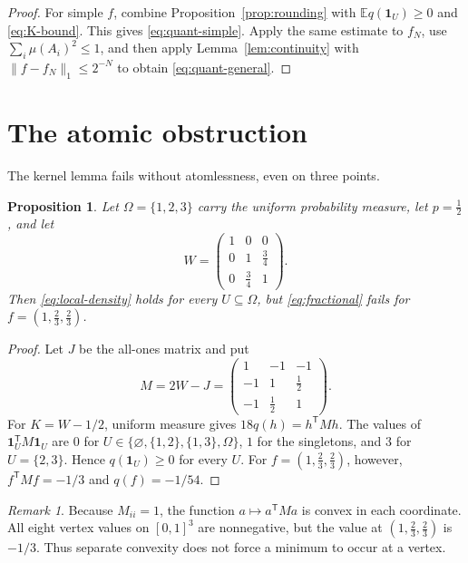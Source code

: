\documentclass[reqno]{amsart}
\theoremstyle{plain}
\newtheorem{proposition}[theorem]{Proposition}
\theoremstyle{remark}
\newtheorem{remark}[theorem]{Remark}
\newcommand{\one}{\mathbf 1}
\newcommand{\E}{\mathbb E}
\newcommand{\normone}[1]{\lVert #1\rVert_1}
\begin{document}
\begin{proof}
For simple $f$, combine Proposition~\ref{prop:rounding} with
$\E q(\one_U)\geq0$ and \eqref{eq:K-bound}. This gives
\eqref{eq:quant-simple}. Apply the same estimate to $f_N$, use
$\sum_i\mu(A_i)^2\leq1$, and then apply Lemma~\ref{lem:continuity} with
$\normone{f-f_N}\leq2^{-N}$ to obtain \eqref{eq:quant-general}.
\end{proof}

\section{The atomic obstruction}\label{sec:atoms}

The kernel lemma fails without atomlessness, even on three points.

\begin{proposition}\label{prop:atomic-example}
Let $\Omega=\{1,2,3\}$ carry the uniform probability measure, let
$p=\tfrac12$, and let
\[
  W=
  \begin{pmatrix}
    1&0&0\\
    0&1&\tfrac34\\
    0&\tfrac34&1
  \end{pmatrix}.
\]
Then \eqref{eq:local-density} holds for every $U\subseteq\Omega$, but
\eqref{eq:fractional} fails for $f=(1,\tfrac23,\tfrac23)$.
\end{proposition}

\begin{proof}
Let $J$ be the all-ones matrix and put
\[
  M=2W-J=
  \begin{pmatrix}
    1&-1&-1\\
    -1&1&\tfrac12\\
    -1&\tfrac12&1
  \end{pmatrix}.
\]
For $K=W-1/2$, uniform measure gives
$18q(h)=h^{\mathsf T}Mh$. The values of
$\one_U^{\mathsf T}M\one_U$ are $0$ for
$U\in\{\varnothing,\{1,2\},\{1,3\},\Omega\}$, $1$ for the singletons, and
$3$ for $U=\{2,3\}$. Hence $q(\one_U)\geq0$ for every $U$. For
$f=(1,\tfrac23,\tfrac23)$, however, $f^{\mathsf T}Mf=-1/3$ and
$q(f)=-1/54$.
\end{proof}

\begin{remark}\label{rem:convexity}
Because $M_{ii}=1$, the function $a\mapsto a^{\mathsf T}Ma$ is convex in each
coordinate. All eight vertex values on $[0,1]^3$ are nonnegative, but the
value at $(1,\tfrac23,\tfrac23)$ is $-1/3$. Thus separate convexity does not
force a minimum to occur at a vertex.
\end{remark}
\end{document}
